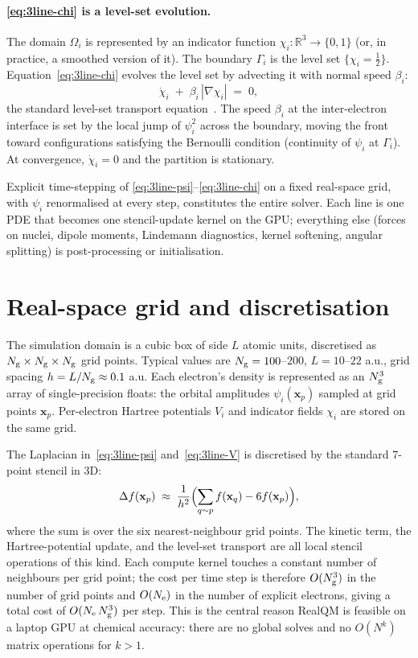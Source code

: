 \paragraph{\eqref{eq:3line-chi} is a level-set evolution.} The domain $\Omega_i$ is represented by an indicator function $\chi_i : \mathbb{R}^3 \to \{0, 1\}$ (or, in practice, a smoothed version of it). The boundary $\Gamma_i$ is the level set $\{\chi_i = \tfrac{1}{2}\}$. Equation~\eqref{eq:3line-chi} evolves the level set by advecting it with normal speed $\beta_i$:
\[
\dot{\chi}_i \;+\; \beta_i\, |\nabla \chi_i| \;=\; 0,
\]
the standard level-set transport equation~\cite{OsherSethian}. The speed $\beta_i$ at the inter-electron interface is set by the local jump of $\psi_i^2$ across the boundary, moving the front toward configurations satisfying the Bernoulli condition (continuity of $\psi_i$ at $\Gamma_i$). At convergence, $\dot{\chi}_i = 0$ and the partition is stationary.

Explicit time-stepping of \eqref{eq:3line-psi}--\eqref{eq:3line-chi} on a fixed real-space grid, with $\psi_i$ renormalised at every step, constitutes the entire solver. Each line is one PDE that becomes one stencil-update kernel on the GPU; everything else (forces on nuclei, dipole moments, Lindemann diagnostics, kernel softening, angular splitting) is post-processing or initialisation.

\section{Real-space grid and discretisation}\label{sec:grid}

The simulation domain is a cubic box of side $L$ atomic units, discretised as $N_{\rm g} \times N_{\rm g} \times N_{\rm g}$ grid points. Typical values are $N_{\rm g} = 100$--$200$, $L = 10$--$22$ a.u., grid spacing $h = L / N_{\rm g} \approx 0.1$ a.u. Each electron's density is represented as an $N_{\rm g}^3$ array of single-precision floats: the orbital amplitudes $\psi_i(\mathbf{x}_p)$ sampled at grid points $\mathbf{x}_p$. Per-electron Hartree potentials $V_i$ and indicator fields $\chi_i$ are stored on the same grid.

The Laplacian in~\eqref{eq:3line-psi} and~\eqref{eq:3line-V} is discretised by the standard 7-point stencil in 3D:
\[
\Delta f(\mathbf{x}_p) \;\approx\; \frac{1}{h^2}\Bigl(\sum_{q \sim p} f(\mathbf{x}_q) - 6 f(\mathbf{x}_p)\Bigr),
\]
where the sum is over the six nearest-neighbour grid points. The kinetic term, the Hartree-potential update, and the level-set transport are all local stencil operations of this kind. Each compute kernel touches a constant number of neighbours per grid point; the cost per time step is therefore $O(N_{\rm g}^3)$ in the number of grid points and $O(N_{\rm e})$ in the number of explicit electrons, giving a total cost of $O(N_{\rm e}\,N_{\rm g}^3)$ per step. This is the central reason RealQM is feasible on a laptop GPU at chemical accuracy: there are no global solves and no $O(N^k)$ matrix operations for $k>1$.

